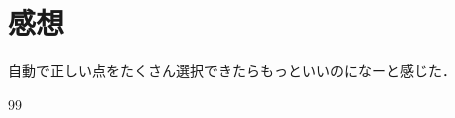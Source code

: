 \documentclass[autodetect-engine,dvi=dvipdfmx,ja=standard,
               a4j,11pt]{bxjsarticle}
\begin{document}


\section{感想}

自動で正しい点をたくさん選択できたらもっといいのになーと感じた．

\begin{thebibliography}{99}
\end{thebibliography}

\end{document}
